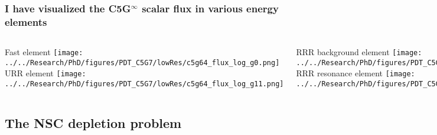 \documentclass[compress,10pt]{beamer}
\begin{document}
\begin{frame}
    \frametitle{I have visualized the C5G$^\infty$ scalar flux in various energy elements}

    \centering
    \begin{columns}[c]

        \centering

        {\small Fast element}
         {}\texttt{[image: ../../Research/PhD/figures/PDT\_C5G7/lowRes/c5g64\_flux\_log\_g0.png]} \\

        {\small URR element}
         {}\texttt{[image: ../../Research/PhD/figures/PDT\_C5G7/lowRes/c5g64\_flux\_log\_g11.png]} \\


        \centering
        {\small RRR background element}
         {}\texttt{[image: ../../Research/PhD/figures/PDT\_C5G7/lowRes/c5g64\_flux\_log\_g30.png]} \\

	{\small RRR resonance element}
         {}\texttt{[image: ../../Research/PhD/figures/PDT\_C5G7/lowRes/c5g64\_flux\_log\_g35.png]} \\

        \centering

         {\small Epithermal element}
          {}\texttt{[image: ../../Research/PhD/figures/PDT\_C5G7/lowRes/c5g64\_flux\_log\_g51.png]} \\

         {\small Thermal element}
          {}\texttt{[image: ../../Research/PhD/figures/PDT\_C5G7/lowRes/c5g64\_flux\_log\_g62.png]} \\

    \end{columns}

\end{frame}

\subsection{The NSC depletion problem}

\typeout{***********************************************************************************}
\end{document}
